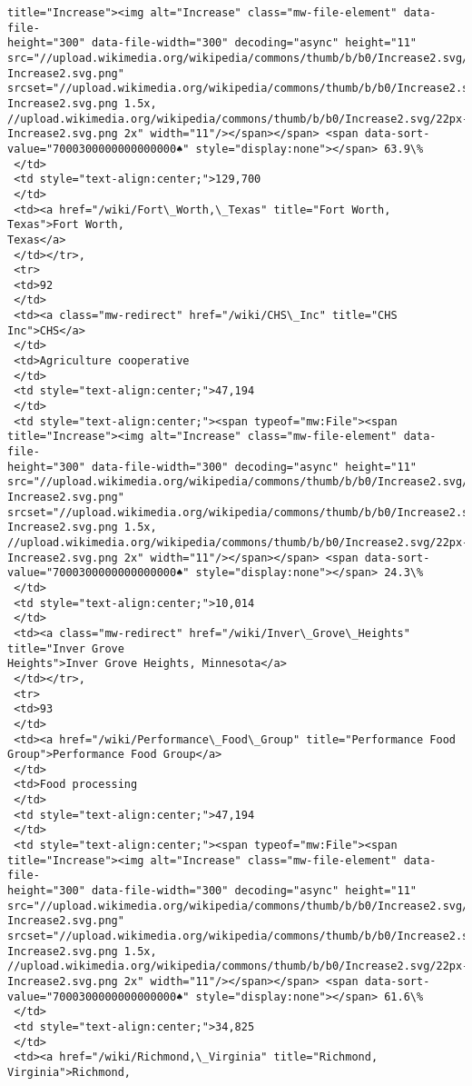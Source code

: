 \documentclass[11pt]{article}
\begin{document}
\begin{tcolorbox}[breakable, size=fbox, boxrule=.5pt, pad at break*=1mm, opacityfill=0]
\begin{Verbatim}[commandchars=\\\{\}]
title="Increase"><img alt="Increase" class="mw-file-element" data-file-
height="300" data-file-width="300" decoding="async" height="11"
src="//upload.wikimedia.org/wikipedia/commons/thumb/b/b0/Increase2.svg/11px-
Increase2.svg.png"
srcset="//upload.wikimedia.org/wikipedia/commons/thumb/b/b0/Increase2.svg/17px-
Increase2.svg.png 1.5x,
//upload.wikimedia.org/wikipedia/commons/thumb/b/b0/Increase2.svg/22px-
Increase2.svg.png 2x" width="11"/></span></span> <span data-sort-
value="7000300000000000000♠" style="display:none"></span> 63.9\%
 </td>
 <td style="text-align:center;">129,700
 </td>
 <td><a href="/wiki/Fort\_Worth,\_Texas" title="Fort Worth, Texas">Fort Worth,
Texas</a>
 </td></tr>,
 <tr>
 <td>92
 </td>
 <td><a class="mw-redirect" href="/wiki/CHS\_Inc" title="CHS Inc">CHS</a>
 </td>
 <td>Agriculture cooperative
 </td>
 <td style="text-align:center;">47,194
 </td>
 <td style="text-align:center;"><span typeof="mw:File"><span
title="Increase"><img alt="Increase" class="mw-file-element" data-file-
height="300" data-file-width="300" decoding="async" height="11"
src="//upload.wikimedia.org/wikipedia/commons/thumb/b/b0/Increase2.svg/11px-
Increase2.svg.png"
srcset="//upload.wikimedia.org/wikipedia/commons/thumb/b/b0/Increase2.svg/17px-
Increase2.svg.png 1.5x,
//upload.wikimedia.org/wikipedia/commons/thumb/b/b0/Increase2.svg/22px-
Increase2.svg.png 2x" width="11"/></span></span> <span data-sort-
value="7000300000000000000♠" style="display:none"></span> 24.3\%
 </td>
 <td style="text-align:center;">10,014
 </td>
 <td><a class="mw-redirect" href="/wiki/Inver\_Grove\_Heights" title="Inver Grove
Heights">Inver Grove Heights, Minnesota</a>
 </td></tr>,
 <tr>
 <td>93
 </td>
 <td><a href="/wiki/Performance\_Food\_Group" title="Performance Food
Group">Performance Food Group</a>
 </td>
 <td>Food processing
 </td>
 <td style="text-align:center;">47,194
 </td>
 <td style="text-align:center;"><span typeof="mw:File"><span
title="Increase"><img alt="Increase" class="mw-file-element" data-file-
height="300" data-file-width="300" decoding="async" height="11"
src="//upload.wikimedia.org/wikipedia/commons/thumb/b/b0/Increase2.svg/11px-
Increase2.svg.png"
srcset="//upload.wikimedia.org/wikipedia/commons/thumb/b/b0/Increase2.svg/17px-
Increase2.svg.png 1.5x,
//upload.wikimedia.org/wikipedia/commons/thumb/b/b0/Increase2.svg/22px-
Increase2.svg.png 2x" width="11"/></span></span> <span data-sort-
value="7000300000000000000♠" style="display:none"></span> 61.6\%
 </td>
 <td style="text-align:center;">34,825
 </td>
 <td><a href="/wiki/Richmond,\_Virginia" title="Richmond, Virginia">Richmond,

\end{Verbatim}
\end{tcolorbox}
\end{document}
